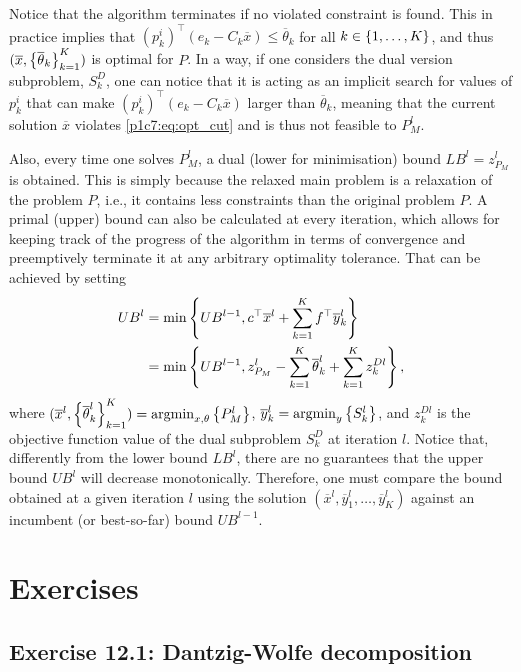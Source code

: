 Notice that the algorithm terminates if no violated constraint is found. This in practice implies that $(p^i_k)^\top(e_k - C_k \overline{x}) \leq \overline{\theta}_k$ for all $k \in \left\{ 1,\dots,K \right \}$, and thus $(\overline{x}, \left\{ \overline{\theta}_k \right \}_{k=1}^K)$ is optimal for $P$. In a way, if one considers the dual version subproblem, $S_k^D$, one can notice that it is acting as an implicit search for values of $p^i_k$ that can make $(p^i_k)^\top(e_k - C_k \overline{x})$ larger than $\overline{\theta}_k$, meaning that the current solution $\overline{x}$ violates \eqref{p1c7:eq:opt_cut} and is thus not feasible to $P_M^l$. 

Also, every time one solves $P_M^l$, a dual (lower for minimisation) bound $LB^l = z_{P_M}^l$ is obtained. This is simply because the relaxed main problem is a relaxation of the problem $P$, i.e., it contains less constraints than the original problem $P$. A primal (upper) bound can also be calculated at every iteration, which allows for keeping track of the progress of the algorithm in terms of convergence and preemptively terminate it at any arbitrary optimality tolerance. That can be achieved by setting
%
\begin{align*}
	UB^l &= \min\left\{ UB^{l-1}, c^\top \overline{x}^l + \sum_{k=1}^K f^\top \overline{y}_k^l \right \} \\	
	&= \min\left\{ UB^{l-1}, z_{P_M}^l - \sum_{k=1}^K \overline{\theta}_k^l + \sum_{k=1}^K z^{Dl}_{k} \right \},
\end{align*}
%
where $(\overline{x}^l, \left\{ \overline{\theta}^{l}_k \right \}_{k=1}^K) = \mathop{\rm argmin}_{x, \theta} \left\{ P_M^l \right \}$, $\overline{y}_k^l = \mathop{\rm argmin}_y \left\{ S_k^l \right \}$, and $z^{Dl}_{k}$ is the objective function value of the dual subproblem $S_k^D$ at iteration $l$. Notice that, differently from the lower bound $LB^l$, there are no guarantees that the upper bound $UB^l$ will decrease monotonically. Therefore, one must compare the bound obtained at a given iteration $l$ using the solution $(\overline{x}^l, \overline{y}_1^l,\dots, \overline{y}^l_K)$ against an incumbent (or best-so-far) bound $UB^{l-1}$.

\vfill 

\pagebreak	

\section{Exercises}

\subsection*{Exercise 12.1: Dantzig-Wolfe decomposition}


